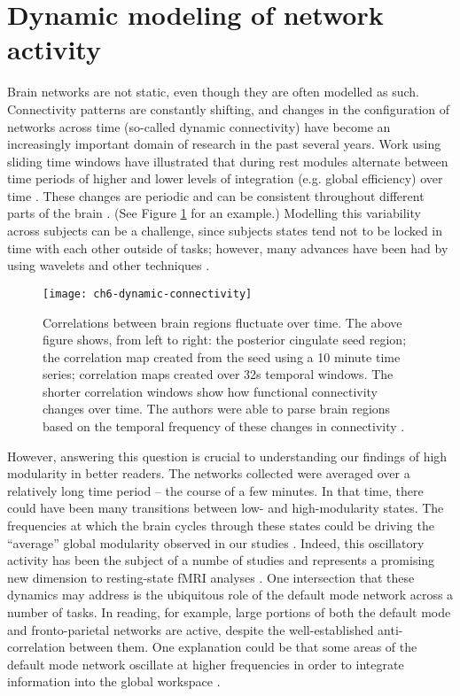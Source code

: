 \section{Dynamic modeling of network activity}

Brain networks are not static, even though they are often modelled as such. Connectivity patterns are constantly shifting, and changes in the configuration of networks across time (so-called dynamic connectivity) have become an increasingly important domain of research in the past several years. Work using sliding time windows have illustrated that during rest modules alternate between time periods of higher and lower levels of integration (e.g. global efficiency) over time \citep{Zalesky2014}. These changes are periodic and can be consistent throughout different parts of the brain \citep{Handwerker2012}. (See Figure \ref{fig:ch6-dynamic-connectivity} for an example.) Modelling this variability across subjects can be a challenge, since subjects states tend not to be locked in time with each other outside of tasks; however, many advances have been had by using wavelets and other techniques \citep{Zalesky2014}. 

\begin{figure}[t]
	\centering
	\texttt{[image: ch6-dynamic-connectivity]}
	\caption[Correlations between brain regions fluctuate over time]{Correlations between brain regions fluctuate over time. The above figure shows, from left to right: the posterior cingulate seed region; the correlation map created from the seed using a 10 minute time series; correlation maps created over 32s temporal windows. The shorter correlation windows show how functional connectivity changes over time. The authors were able to parse brain regions based on the temporal frequency of these changes in connectivity \citep{Handwerker2012}.}
	\label{fig:ch6-dynamic-connectivity}
\end{figure}

However, answering this question is crucial to understanding our findings of high modularity in better readers. The networks collected were averaged over a relatively long time period -- the course of a few minutes. In that time, there could have been many transitions between low- and high-modularity states. The frequencies at which the brain cycles through these states could be driving the ``average'' global modularity observed in our studies \citep{Fries2005}. Indeed, this oscillatory activity has been the subject of a numbe of studies and represents a promising new dimension to resting-state fMRI analyses \citep{Hutchison2013}. One intersection that these dynamics may address is the ubiquitous role of the default mode network across a number of tasks. In reading, for example, large portions of both the default mode and fronto-parietal networks are active, despite the well-established anti-correlation between them. One explanation could be that some areas of the default mode network oscillate at higher frequencies in order to integrate information into the global workspace \citep{Vatansever2015}.

